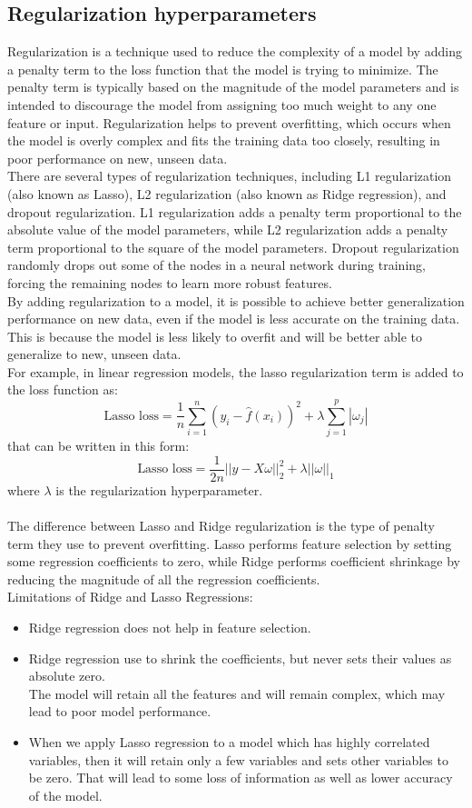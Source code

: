 \documentclass{article}
\begin{document}
\subsection{Regularization hyperparameters}
Regularization is a technique used to reduce the complexity of a model by adding a penalty term to the loss function that the model is trying to minimize. The penalty term is typically based on the magnitude of the model parameters and is intended to discourage the model from assigning too much weight to any one feature or input. Regularization helps to prevent overfitting, which occurs when the model is overly complex and fits the training data too closely, resulting in poor performance on new, unseen data.\\
There are several types of regularization techniques, including L1 regularization (also known as Lasso), L2 regularization (also known as Ridge regression), and dropout regularization. L1 regularization adds a penalty term proportional to the absolute value of the model parameters, while L2 regularization adds a penalty term proportional to the square of the model parameters. Dropout regularization randomly drops out some of the nodes in a neural network during training, forcing the remaining nodes to learn more robust features.\\
By adding regularization to a model, it is possible to achieve better generalization performance on new data, even if the model is less accurate on the training data. This is because the model is less likely to overfit and will be better able to generalize to new, unseen data.\\
\noindent For example, in linear regression models, the lasso regularization term is added to the loss function as:
\[\text{Lasso loss} = \frac{1}{n} \sum_{i=1}^n (y_i - \hat{f}(x_i))^2 + \lambda \sum_{j=1}^p |\omega_j|\]
that can be written in this form:
\[\text{Lasso loss} = \frac{1}{2n} ||y - X\omega||_2^2 + \lambda ||\omega||_1\]
where $\lambda$ is the regularization hyperparameter.\\\\
The difference between Lasso and Ridge regularization is the type of penalty term they use to prevent overfitting.
Lasso performs feature selection by setting some regression coefficients to zero, while Ridge performs coefficient shrinkage by reducing the magnitude of all the regression coefficients.\\
Limitations of Ridge and Lasso Regressions:
\begin{itemize}
    \item Ridge regression does not help in feature selection.
    \item Ridge regression use to shrink the coefficients, but never sets their values as absolute zero.\\
    The model will retain all the features and will remain complex, which may lead to poor model performance.
    \item When we apply Lasso regression to a model which has highly correlated variables, then it will retain only a few variables and sets other variables to be zero. That will lead to some loss of information as well as lower
    accuracy of the model.
\end{itemize}
\end{document}
